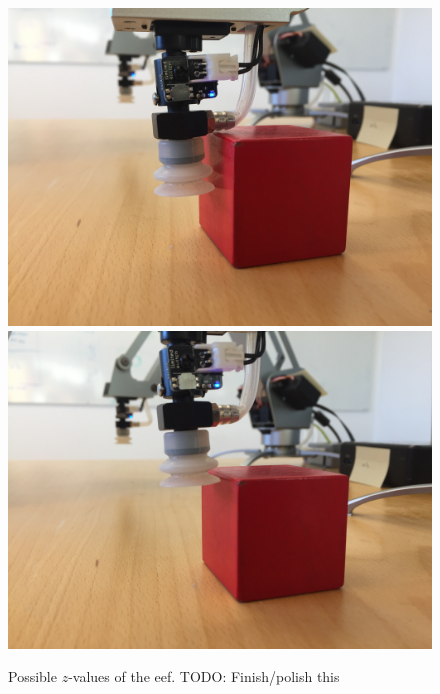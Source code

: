 \begin{figure}[h]
    \centering
    \includegraphics[width=0.40 \textwidth]{res/eef_cube_low.jpg}
    \includegraphics[width=0.40 \textwidth]{res/eef_cube_high.jpg}

    \caption{Possible $z$-values of the eef. TODO: Finish/polish this}
    
\end{figure}
